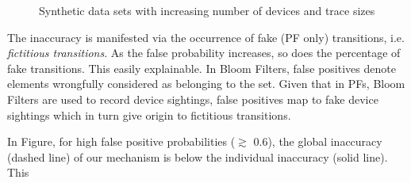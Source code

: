 \begin{figure}[htb]
\hspace*{-0.7em}
\hspace*{-0.7em}
\caption{Synthetic data sets with increasing number of devices and
  trace sizes}
\label{fig:perf_results_sim_devices_traces}
\end{figure}


The inaccuracy is manifested via the occurrence of fake (PF only)
transitions, i.e. \emph{fictitious transitions}. As the false
probability increases, so does the percentage of fake
transitions. This easily explainable. In Bloom Filters, false
positives denote elements wrongfully considered as belonging to the
set. Given that in PFs, Bloom Filters are used to record device
sightings, false positives map to fake device sightings which in turn
give origin to fictitious transitions.

In Figure, for high false positive
probabilities ($\gtrsim$ 0.6), the global inaccuracy (dashed line) of our
mechanism is below the individual inaccuracy (solid line). This

